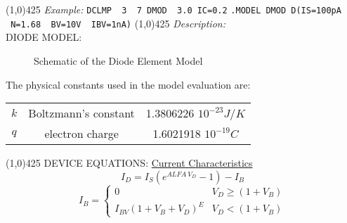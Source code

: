\newline
\linethickness{0.5mm} \line(1,0){425}
\newline
\textit{Example:}
\newline
\texttt{DCLMP \ 3 \ 7 DMOD \ 3.0 IC=0.2}
\newline
\texttt{.MODEL DMOD D(\texttt{IS}=100pA \ \texttt{N}=1.68 \
\texttt{BV}=10V \ \texttt{IBV}=1nA)}
\newline
\linethickness{0.5mm} \line(1,0){425}
\newline
\textit{Description:}\\
DIODE MODEL:\\
\begin{figure}[h]
\centerline{\epsfxsize=1.5in}
\caption{Schematic of the Diode Element Model}
\end{figure}
\newline
The physical constants used in the model evaluation are:
\newline
\begin{tabular}{c c c}
$k$ & Boltzmann's constant & 1.3806226 $10^{-23} J/K$ \\
$q$ & electron charge & 1.6021918 $10^{-19} C$
\end{tabular}
\newline
\line(1,0){425}
\newline
DEVICE EQUATIONS:
\newline
\underline{Current Characteristics}
\newline
\begin{equation}
I_D = I_S(e^{ALFA \: V_D} - 1) - I_B
\end{equation}
\begin{equation}
I_B = \left\{ \begin{array}{ll}
                0 & V_D \geq (1+V_B) \\
                I_{BV}{(1+V_B+V_D)}^E & V_D < (1+V_B)
                \end{array}
        \right.
\end{equation}
